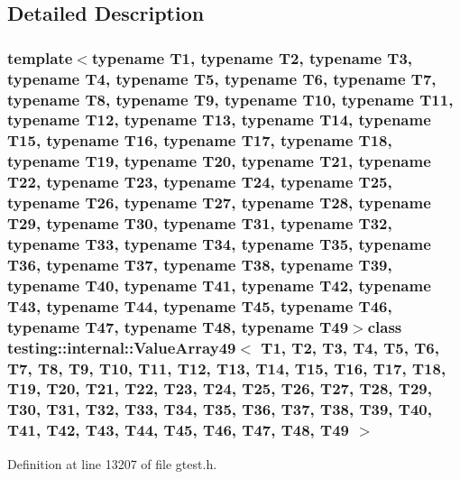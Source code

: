 \subsection{\-Detailed \-Description}
\subsubsection*{template$<$typename T1, typename T2, typename T3, typename T4, typename T5, typename T6, typename T7, typename T8, typename T9, typename T10, typename T11, typename T12, typename T13, typename T14, typename T15, typename T16, typename T17, typename T18, typename T19, typename T20, typename T21, typename T22, typename T23, typename T24, typename T25, typename T26, typename T27, typename T28, typename T29, typename T30, typename T31, typename T32, typename T33, typename T34, typename T35, typename T36, typename T37, typename T38, typename T39, typename T40, typename T41, typename T42, typename T43, typename T44, typename T45, typename T46, typename T47, typename T48, typename T49$>$class testing\-::internal\-::\-Value\-Array49$<$ T1, T2, T3, T4, T5, T6, T7, T8, T9, T10, T11, T12, T13, T14, T15, T16, T17, T18, T19, T20, T21, T22, T23, T24, T25, T26, T27, T28, T29, T30, T31, T32, T33, T34, T35, T36, T37, T38, T39, T40, T41, T42, T43, T44, T45, T46, T47, T48, T49 $>$}



\-Definition at line 13207 of file gtest.\-h.



